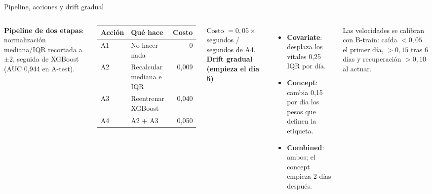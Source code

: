 \documentclass[aspectratio=169,10pt,xcolor=table]{beamer}
\begin{document}
\begin{frame}{Pipeline, acciones y drift gradual}
\begin{columns}[T]
\textbf{Pipeline de dos etapas}: normalización mediana/IQR recortada a $\pm 2$,
seguida de XGBoost (AUC 0,944 en A-test).
\vspace{0.4em}

\small
\begin{tabular}{@{}llr@{}}
\toprule
Acción & Qué hace & Costo \\
\midrule
A1 & No hacer nada & 0 \\
A2 & Recalcular mediana e IQR & 0,009 \\
A3 & Reentrenar XGBoost & 0,040 \\
A4 & A2 + A3 & 0,050 \\
\bottomrule
\end{tabular}

\vspace{0.3em}
\footnotesize Costo $= 0{,}05 \times$ segundos / segundos de A4.
\textbf{Drift gradual (empieza el día 5)}
\begin{itemize}
  \item \textbf{Covariate}: desplaza los vitales 0,25 IQR por día.
  \item \textbf{Concept}: cambia 0,15 por día los pesos que definen la etiqueta.
  \item \textbf{Combined}: ambos; el concept empieza 2 días después.
\end{itemize}
\vspace{0.2em}
Las velocidades se calibran con B-train: caída $<0{,}05$ el primer día,
$>0{,}15$ tras 6 días y recuperación $>0{,}10$ al actuar.
\end{columns}
\end{frame}
\end{document}
